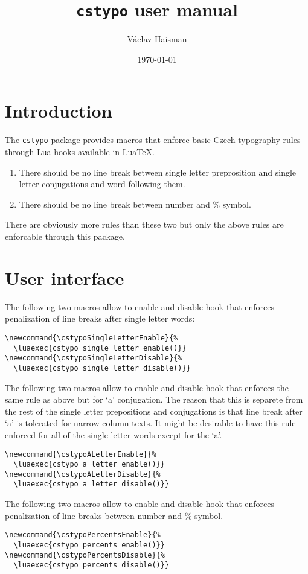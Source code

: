 \documentclass{article}
\author{Václav Haisman}
\date{\today}
\title{\texttt{cstypo} user manual}
\begin{document}
\begin{titlepage}
  \maketitle
\end{titlepage}

\section{Introduction}
The \texttt{cstypo} package provides macros that enforce basic Czech
typography rules through Lua hooks available in LuaTeX.

\begin{enumerate}%
\item\label{itm:singleletter} There should be no line break between single
  letter preprosition and single letter conjugations and word following them.
\item\label{itm:percents} There should be no line break between number and \%
  symbol.
\end{enumerate}

There are obviously more rules than these two but only the above rules are
enforcable through this package.

\section{User interface}

The following two macros allow to enable and disable hook that enforces
penalization of line breaks after single letter words:

\begin{lstlisting}[style=myLatexStyle]
\newcommand{\cstypoSingleLetterEnable}{%
  \luaexec{cstypo_single_letter_enable()}}
\newcommand{\cstypoSingleLetterDisable}{%
  \luaexec{cstypo_single_letter_disable()}}
\end{lstlisting}

The following two macros allow to enable and disable hook that enforces the
same rule as above but for ‘a’ conjugation. The reason that this is separete
from the rest of the single letter prepositions and conjugations is that line
break after ‘a’ is tolerated for narrow column texts. It might be desirable
to have this rule enforced for all of the single letter words except for the
‘a’.

\begin{lstlisting}[style=myLatexStyle]
\newcommand{\cstypoALetterEnable}{%
  \luaexec{cstypo_a_letter_enable()}}
\newcommand{\cstypoALetterDisable}{%
  \luaexec{cstypo_a_letter_disable()}}
\end{lstlisting}

The following two macros allow to enable and disable hook that enforces
penalization of line breaks between number and \% symbol.

\begin{lstlisting}[style=myLatexStyle]
\newcommand{\cstypoPercentsEnable}{%
  \luaexec{cstypo_percents_enable()}}
\newcommand{\cstypoPercentsDisable}{%
  \luaexec{cstypo_percents_disable()}}
\end{lstlisting}
\end{document}
